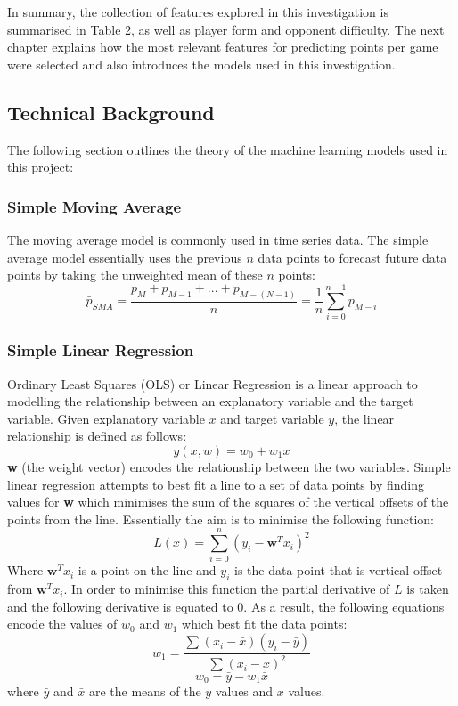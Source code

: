 \documentclass[a4paper,11pt,twoside]{article}
\begin{document}
In summary, the collection of features explored in this investigation is summarised in Table 2, as well as player form and opponent difficulty. The next chapter explains how the most relevant features for predicting points per game were selected and also introduces the models used in this investigation.  

\subsection{Technical Background}
The following section outlines the theory of the machine learning models used in this project:

\subsubsection{Simple Moving Average}

The moving average model is commonly used in time series data. The simple average model essentially uses the previous $n$ data points to forecast future data points by taking the unweighted mean of these $n$ points:
\begin{equation}
\bar{p}_{SMA} = \frac{p_{M} + p_{M-1} + ... + p_{M-(N-1)}} {n} 
= \frac{1}{n} \sum_{i=0}^{n-1}p_{M-i}
\end{equation}

\subsubsection{Simple Linear Regression}

Ordinary Least Squares (OLS) or Linear Regression is a linear approach to modelling the relationship between an explanatory variable and the target variable.  Given explanatory variable \(x\) and target variable \(y\), the linear relationship is defined as follows:
\begin{equation}
y(x,w) = w_{0} + w_{1}x
\end{equation}
\textbf{w} (the weight vector) encodes the relationship between the two variables. Simple linear regression attempts to best fit a line to a set of data points by finding values for \textbf{w} which minimises the sum of the squares of the vertical offsets of the points from the line. Essentially the aim is to minimise the following function:
\begin{equation}
L(x) = \sum_{i=0}^{n}(y_{i}-\textbf{w}^Tx_{i})^2
\end{equation}
Where $\textbf{w}^Tx_{i}$ is a point on the line  and \(y_i\) is the data point that is vertical offset from  $\textbf{w}^Tx_{i}$. In order to minimise this function the partial derivative of $L$ is taken and the following derivative is equated to 0. As a result, the following equations encode the values of \(w_{0}\) and \(w_{1}\) which best fit the data points:
\begin{equation}
w_{1} =\frac{\sum{}^{} (x_{i} - \bar{x})(y_{i} - \bar{y})}{\sum{}^{}(x_{i} - \bar{x})^2}
\end{equation}
\begin{equation}
w_{0} = \bar{y} - w_{1}\bar{x}
\end{equation}
where $\bar{y}$ and $\bar{x}$  are the means of the $y$ values and $x$ values.
\end{document}
